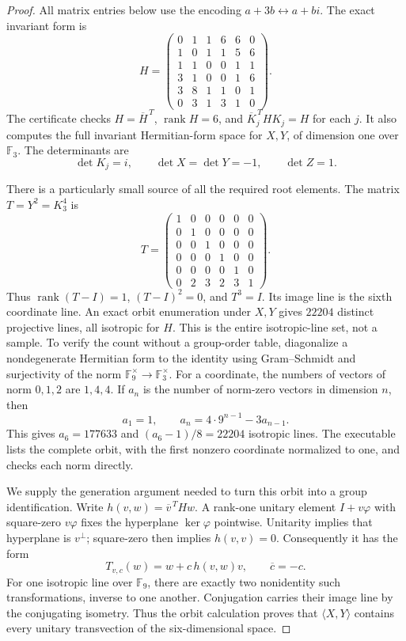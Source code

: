 \begin{proof}
All matrix entries below use the encoding $a+3b\leftrightarrow a+bi$.
The exact invariant form is
\[
 H=\begin{pmatrix}
 0&1&1&6&6&0\\
 1&0&1&1&5&6\\
 1&1&0&0&1&1\\
 3&1&0&0&1&6\\
 3&8&1&1&0&1\\
 0&3&1&3&1&0
 \end{pmatrix}.
\tag{D23.F25.3}
\]
The certificate checks $H=\overline H^{\,T}$, $\operatorname{rank}H=6$,
and $\overline K_j^{\,T}HK_j=H$ for each $j$.  It also computes
the full invariant Hermitian-form space for $X,Y$, of dimension
one over $\mathbb F_3$.  The determinants are
\[
 \det K_j=i,\qquad \det X=\det Y=-1,\qquad\det Z=1.
\tag{D23.F25.4}
\]

There is a particularly small source of all the required root
elements.  The matrix $T=Y^2=K_3^4$ is
\[
 T=\begin{pmatrix}
 1&0&0&0&0&0\\0&1&0&0&0&0\\0&0&1&0&0&0\\
 0&0&0&1&0&0\\0&0&0&0&1&0\\0&2&3&2&3&1
 \end{pmatrix}.
\tag{D23.F25.5}
\]
Thus $\operatorname{rank}(T-I)=1$, $(T-I)^2=0$, and $T^3=I$.
Its image line is the sixth coordinate line.  An exact orbit
enumeration under $X,Y$ gives $22204$ distinct projective lines,
all isotropic for $H$.  This is the entire isotropic-line set,
not a sample.  To verify the count without a group-order table,
diagonalize a nondegenerate Hermitian form to the identity using
Gram--Schmidt and surjectivity of the norm $\mathbb F_9^\times
\to\mathbb F_3^\times$.  For a coordinate, the numbers of vectors
of norm $0,1,2$ are $1,4,4$.  If $a_n$ is the number of norm-zero
vectors in dimension $n$, then
\[
       a_1=1,\qquad a_n=4\cdot9^{n-1}-3a_{n-1}.
\]
This gives $a_6=177633$ and $(a_6-1)/8=22204$ isotropic lines.
The executable lists the complete orbit, with the first nonzero
coordinate normalized to one, and checks each norm directly.

We supply the generation argument needed to turn this orbit into
a group identification.  Write $h(v,w)=\overline v^{\,T}Hw$.
A rank-one unitary element $I+v\varphi$ with square-zero
$v\varphi$ fixes the hyperplane $\ker\varphi$ pointwise.
Unitarity implies that hyperplane is $v^\perp$; square-zero then
implies $h(v,v)=0$.  Consequently it has the form
\[
       T_{v,c}(w)=w+c\,h(v,w)v,\qquad \overline c=-c.
\tag{D23.F25.6}
\]
For one isotropic line over $\mathbb F_9$, there are exactly two
nonidentity such transformations, inverse to one another.
Conjugation carries their image line by the conjugating isometry.
Thus the orbit calculation proves that $\langle X,Y\rangle$
contains every unitary transvection of the six-dimensional space.


\end{proof}
